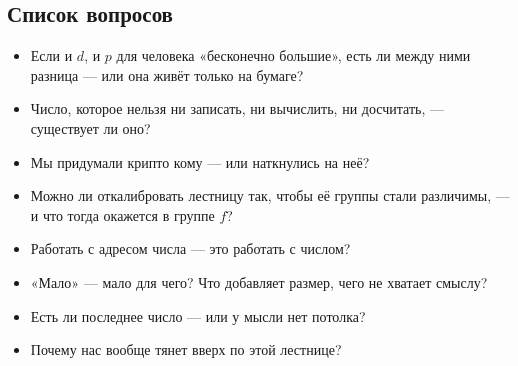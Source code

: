 \subsection{Список вопросов}
\begin{itemize}
  \item Если и \(d\), и \(p\) для человека «бесконечно большие», есть ли между ними
        разница --- или она живёт только на бумаге?
  \item Число, которое нельзя ни записать, ни вычислить, ни досчитать, --- существует ли оно?
  \item Мы придумали крипто кому --- или наткнулись на неё?
  \item Можно ли откалибровать лестницу так, чтобы её группы стали различимы, --- и что
        тогда окажется в группе \(f\)?
  \item Работать с адресом числа --- это работать с числом?
  \item «Мало» --- мало для чего? Что добавляет размер, чего не хватает смыслу?
  \item Есть ли последнее число --- или у мысли нет потолка?
  \item Почему нас вообще тянет вверх по этой лестнице?
\end{itemize}
